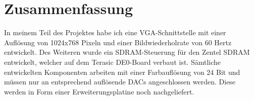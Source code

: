 \chapter{Zusammenfassung}
\label{cha:Zusammenfassung}

In meinem Teil des Projektes habe ich eine VGA-Schnittstelle mit einer Auflösung von 1024x768 Pixeln und einer Bildwiederholrate von 60 Hertz entwickelt.
Des Weiteren wurde ein SDRAM-Steuerung für den Zentel SDRAM entwickelt, welcher auf dem Terasic DE0-Board verbaut ist.
Sämtliche entwickelten Komponenten arbeiten mit einer Farbauflösung von 24 Bit und müssen nur an entsprechend auflösende DACs angeschlossen werden. Diese werden in Form einer Erweiterungsplatine noch nachgeliefert.